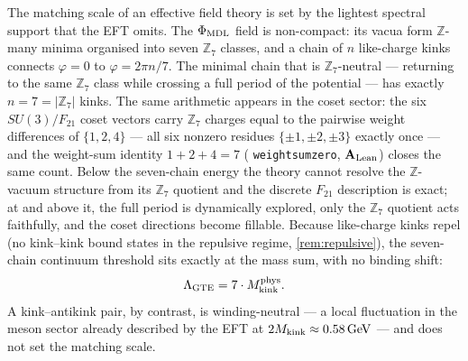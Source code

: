 \documentclass[11pt]{article}
\theoremstyle{remark}
\newcommand{\GTE}{\text{GTE}}
\newcommand{\ZS}{\mathbb{Z}_7}
\newcommand{\ZZ}{\mathbb{Z}}
\newcommand{\phimdl}{\Phi_{\rm MDL}}
\newcommand{\Ftwentyone}{F_{21}}
\newcommand{\lean}[1]{%
  \penalty-100
  \begingroup\def\_{\textunderscore\allowbreak}\texttt{#1}\endgroup}
\newcommand{\CatAL}{\ensuremath{\textbf{A}_{\rm Lean}}}
\begin{document}
The matching scale of an effective field theory is set by the lightest
spectral support that the EFT omits.
The $\phimdl$ field is non-compact: its vacua form $\ZZ$-many minima organised
into seven $\ZS$ classes, and a chain of $n$ like-charge kinks connects
$\varphi = 0$ to $\varphi = 2\pi n/7$.
The minimal chain that is $\ZS$-neutral --- returning to the same $\ZS$ class
while crossing a full period of the potential --- has exactly
$n = 7 = |\ZS|$ kinks.
The same arithmetic appears in the coset sector: the six
$SU(3)/\Ftwentyone$ coset vectors carry $\ZS$ charges equal to the pairwise
weight differences of $\{1,2,4\}$ --- all six nonzero residues
$\{\pm 1, \pm 2, \pm 3\}$ exactly once --- and the weight-sum identity
$1 + 2 + 4 = 7$ (\lean{weight\_sum\_zero}, \CatAL{}) closes the same count.
Below the seven-chain energy the theory cannot resolve the $\ZZ$-vacuum
structure from its $\ZS$ quotient and the discrete $\Ftwentyone$ description
is exact; at and above it, the full period is dynamically explored, only the
$\ZS$ quotient acts faithfully, and the coset directions become fillable.
Because like-charge kinks repel (no kink--kink bound states in the repulsive
regime, \cref{rem:repulsive}), the seven-chain continuum threshold sits
exactly at the mass sum, with no binding shift:
\begin{equation}
  \Lambda_{\GTE} = 7 \cdot M_{\rm kink}^{\rm phys}.
  \label{eq:lambdagte}
\end{equation}
A kink--antikink pair, by contrast, is winding-neutral --- a local fluctuation
in the meson sector already described by the EFT at $2 M_{\rm kink} \approx
0.58\,\mathrm{GeV}$ --- and does not set the matching scale.
\end{document}
